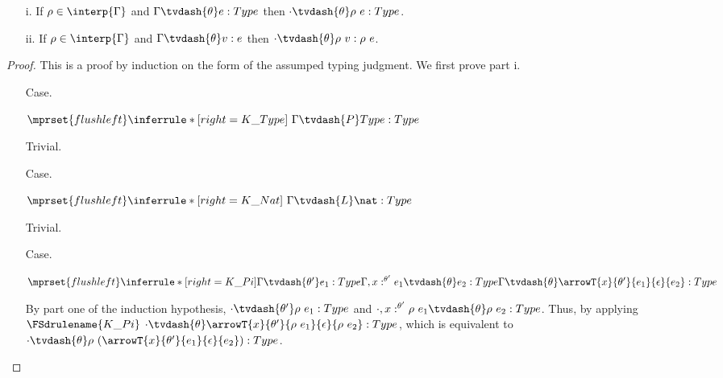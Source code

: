\begin{lemma}
  \label{lemma:substitution_kinding_typing}
  \begin{itemize}
  \item[]
  \item[i.]   If $\rho \in \interp{\Gamma}$ and $\Gamma \tvdash{\theta} e:Type$ then 
    $\cdot \tvdash{\theta} \rho\ e:Type$.
  \item[ii.]   If $\rho \in \interp{\Gamma}$ and $\Gamma \tvdash{\theta} v:e$ then 
    $\cdot \tvdash{\theta} \rho\ v:\rho\ e$.
  \end{itemize}

\end{lemma}
\begin{proof}
  This is a proof by induction on the form of the assumped typing judgment.  We first prove
  part i.
  \begin{itemize}
  \item[Case.]\ \\
    \begin{center}
      \begin{math}
        $$\mprset{flushleft}
        \inferrule* [right=K\_Type] {
          \ 
        }{\Gamma \tvdash{P} Type:Type}
      \end{math}
    \end{center}
    Trivial.
    
    \item[Case.]\ \\
      \begin{center}
        \begin{math}
          $$\mprset{flushleft}
          \inferrule* [right=K\_Nat] {
            \ 
          }{\Gamma \tvdash{L} \nat:Type}
        \end{math}
      \end{center}
      Trivial.
      
    \item[Case.]\ \\
      \begin{center}
        \begin{math}
          $$\mprset{flushleft}
          \inferrule* [right=K\_Pi] {
            \Gamma \tvdash{\theta'} e_1:Type
            \\\\
            \Gamma,x:^{\theta'} e_1 \tvdash{\theta} e_2:Type
          }{\Gamma \tvdash{\theta} \arrowT{x}{\theta'}{e_1}{\epsilon}{e_2}:Type}
        \end{math}
      \end{center}
      By part one of the induction hypothesis, $\cdot \tvdash{\theta'} \rho\ e_1:Type$ and
      $\cdot,x:^{\theta'} \rho\ e_1 \tvdash{\theta} \rho\ e_2:Type$.  Thus, by applying 
      $\FSdrulename{K\_Pi}$ 
      $\cdot \tvdash{\theta} \arrowT{x}{\theta'}{\rho\ e_1}{\epsilon}{\rho\ e_2}:Type$, which
      is equivalent to 
      $\cdot \tvdash{\theta} \rho\ (\arrowT{x}{\theta'}{e_1}{\epsilon}{e_2}):Type$.
      

\end{itemize}
\end{proof}
